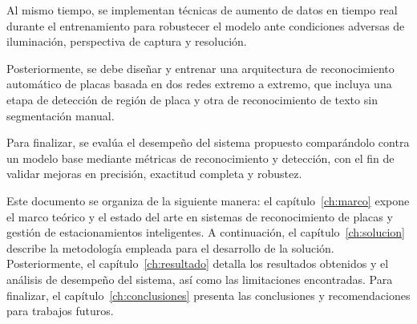 Al mismo tiempo, se implementan técnicas de aumento de datos en tiempo real durante el entrenamiento para 
robustecer el modelo ante condiciones adversas de iluminación, perspectiva de captura y resolución.

Posteriormente, se debe
diseñar y entrenar una arquitectura de reconocimiento automático de placas basada en dos redes
extremo a extremo, que incluya una etapa de detección de región de placa 
y otra de reconocimiento de texto sin segmentación manual.

Para finalizar, se evalúa el desempeño del sistema propuesto comparándolo contra un modelo base
mediante métricas de reconocimiento y detección, con el fin de validar mejoras en precisión,
exactitud completa y robustez.

Este documento se organiza de la siguiente manera:
el capítulo~\ref{ch:marco} expone el marco teórico y el estado del arte en sistemas
de reconocimiento de placas y gestión de estacionamientos inteligentes.
A continuación, el capítulo~\ref{ch:solucion} describe la metodología empleada para el desarrollo de la solución.
Posteriormente, el capítulo~\ref{ch:resultado} detalla los resultados obtenidos y el análisis de desempeño del sistema,
así como las limitaciones encontradas.
Para finalizar, el capítulo~\ref{ch:conclusiones} presenta las conclusiones y recomendaciones para trabajos futuros.

